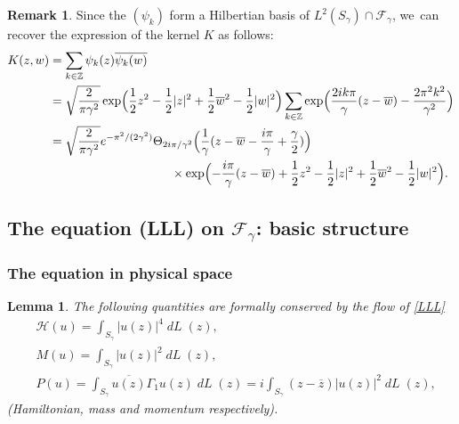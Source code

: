 \documentclass[10pt]{amsart}
\DeclareMathOperator{\dL}{\mathit{dL}}
\newtheorem{lemme}[theorem]{Lemma}
\theoremstyle{definition}
\newtheorem{remark}[theorem]{Remark}
\let\e e
\let\EE\exp
\let\ov\overline
\newcommand\Z{\mathbb Z}
\let\Subsection\subsection\let\Subsubsection\subsubsection
\begin{document}
\begin{remark}

Since the $(\psi_k)$ form a Hilbertian basis of $L^2(S_\gamma) \cap \mathcal{F}_\gamma$, we~can recover the expression of the kernel $K$ as follows:
\begin{align*}
K(z,w)&= \sum_{ k \in \Z } \psi_k(z)\ov{\psi_k(w)}\\
&= \sqrt{\frac{2}{\pi \gamma^2}} \EE\Bigl({\frac12z^2-\frac12|z|^2+\frac12\ov{w}^2-\frac12|w|^2}\Bigr) \sum_{ k \in \Z } \EE\Bigl({\frac{2ik\pi}{\gamma}(z-\ov{w}) -\frac{2\pi^2k^2}{\gamma^2}}\Bigr)\\
&=\sqrt{\frac{2}{\pi \gamma^2}} \e^{-{\pi^2}/{(2\gamma^2)}} \Theta_{{2i\pi}/{\gamma^2}}\Bigl(\frac{1}{\gamma}(z-\ov{w}-\frac{i\pi}{\gamma}+\frac{\gamma}{2})\Bigr) \\
&\hspace{3.5cm} \times \EE\Bigl({-\frac{i\pi}{\gamma}(z-\ov{w}) +\frac12z^2-\frac12|z|^2+\frac12\ov{w}^2-\frac12|w|^2}\Bigr).
\end{align*}
\end{remark}

\Subsection{The equation (LLL) on $\mathcal{F}_{\gamma}$: basic structure}

\Subsubsection{The equation in physical space}

\begin{lemme}\label{lem_conserv}
The following quantities are formally conserved by the flow of \eqref{LLL}
\begin{align*}
& \mathcal{H}(u) = \int_{S_{\gamma}}|u(z)|^{4} \dL(z), \\
& M(u) = \int_{S_{\gamma}}|u(z)|^{2}\dL(z), \\
& P(u) = \int_{S_{\gamma}}\ov{u(z)} \Gamma_1 u(z)\dL(z)= i \int_{S_{\gamma}}(z-\ov{z})|u(z)|^{2}\dL(z),
\end{align*}
(Hamiltonian, mass and momentum respectively).
\end{lemme}
\end{document}
